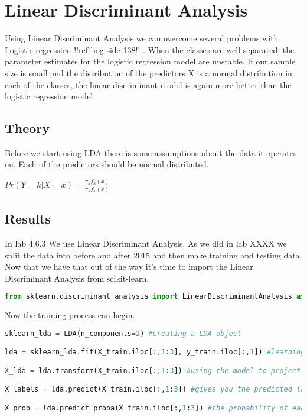 \section{Linear Discriminant Analysis}
Using Linear Discriminant Analysis we can overcome several problems with Logistic regression {  !!ref bog side 138!! }. When the classes are well-separated, the parameter estimates for the
logistic regression model are unstable. If our sample size is small and the distribution of the predictors X is a normal distribution in each of the classes, the linear discriminant model is again more better than the logistic regression model.

\subsection{Theory}
Before we start using LDA there is some assumptions about the data it operates on. Each of the predictors should be normal distributed.

$ Pr(Y=k|X=x) = \frac{\pi_k f_k(x)}{\pi_k f_k(x)} $

\subsection{Results}
In lab 4.6.3 We use Linear Discriminant Analysis. As we did in lab XXXX we split the data into before and after 2015 and then make training and testing data. Now that we have that out of the way it's time to import the Linear Discriminant Analysis from scikit-learn.
\begin{lstlisting}[language=Python]
from sklearn.discriminant_analysis import LinearDiscriminantAnalysis as LDA
\end{lstlisting}

Now the training process can begin.

\begin{lstlisting}[language=Python]
sklearn_lda = LDA(n_components=2) #creating a LDA object

lda = sklearn_lda.fit(X_train.iloc[:,1:3], y_train.iloc[:,1]) #learning the projection matrix

X_lda = lda.transform(X_train.iloc[:,1:3]) #using the model to project X. Project data to maximize class separation.

X_labels = lda.predict(X_train.iloc[:,1:3]) #gives you the predicted label for each sample

X_prob = lda.predict_proba(X_train.iloc[:,1:3]) #the probability of each sample to belong to each class
\end{lstlisting}

